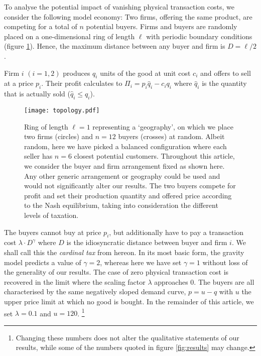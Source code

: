 \documentclass[final,5p,times,twocolumn,11pt,authoryear]{elsarticle}
\numberwithin{equation}{section} %
\begin{document}
To analyse the potential impact of vanishing physical transaction costs, we consider the following model economy: 
Two firms, offering the same product, are competing for a total of $n$ potential buyers. 
Firms and buyers are randomly placed on a one-dimensional ring of length $\ell$ with periodic boundary conditions (figure \ref{fig:topology}). 
Hence, the maximum distance between any buyer and firm is $D=\ell/2$. 


Firm $i$ $(i=1,2)$ produces $q_i$ units of the good at unit cost $c_i$ and offers to sell at a price $p_i$. 
Their profit calculates to $\Pi_i = p_i \hat{q}_i - c_i q_i$ where $\hat{q}_i$ is the quantity that is actually sold ($\hat{q}_i \leqslant q_i$). 

\begin{figure}[!htb]
	\centering
	\texttt{[image: topology.pdf]}
	\caption{	Ring of length $\ell=1$ representing a `geography', on which we place two firms (circles) and $n=12$ buyers (crosses) at random. 
			Albeit random, here we have picked a balanced configuration where each seller has $n=6$ closest potential customers. 
			Throughout this article, we consider the buyer and firm arrangement fixed as shown here. 
			Any other generic arrangement or geography could be used and would not significantly alter our results.
			The two buyers compete for profit and set their production quantity and offered price according to the Nash equilibrium, 
			taking into consideration the different levels of taxation. 
			}
	\label{fig:topology}
\end{figure}

The buyers cannot buy at price $p_i$, but additionally have to pay a transaction cost $\lambda \cdot D^\gamma$ where $D$ is the idiosyncratic distance between buyer and firm $i$. 
We shall call this the \textit{cardinal tax} from hereon. 
In its most basic form, the gravity model predicts a value of $\gamma=2$, whereas here we have set $\gamma=1$ without loss of the generality of our results. 
The case of zero physical transaction cost is recovered in the limit where the scaling factor $\lambda$ approaches $0$. 
The buyers are all characterised by the same negatively sloped demand curve, $p = u - q$ with $u$ the upper price limit at which no good is bought.
In the remainder of this article, we set $\lambda = 0.1$ and $u = 120$. 
\footnote{
Changing these numbers does not alter the qualitative statements of our results, 
while some of the numbers quoted in figure \ref{fig:results} may change.
} 
\end{document}

